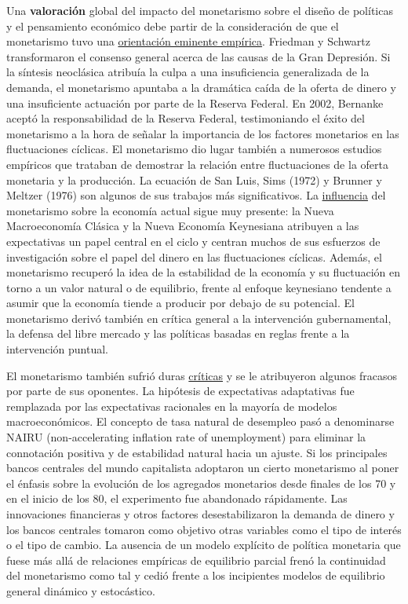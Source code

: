 \documentclass{nuevotema}
\begin{document}
Una \textbf{valoración} global del impacto del monetarismo sobre el diseño de políticas y el pensamiento económico debe partir de la consideración de que el monetarismo tuvo una \underline{orientación eminente empírica}. Friedman y Schwartz transformaron el consenso general acerca de las causas de la Gran Depresión. Si la síntesis neoclásica atribuía la culpa a una insuficiencia generalizada de la demanda, el monetarismo apuntaba a la dramática caída de la oferta de dinero y una insuficiente actuación por parte de la Reserva Federal. En 2002, Bernanke aceptó la responsabilidad de la Reserva Federal, testimoniando el éxito del monetarismo a la hora de señalar la importancia de los factores monetarios en las fluctuaciones cíclicas. El monetarismo dio lugar también a numerosos estudios empíricos que trataban de demostrar la relación entre fluctuaciones de la oferta monetaria y la producción. La ecuación de San Luis, Sims (1972) y Brunner y Meltzer (1976) son algunos de sus trabajos más significativos. La \underline{influencia} del monetarismo sobre la economía actual sigue muy presente: la Nueva Macroeconomía Clásica y la Nueva Economía Keynesiana atribuyen a las expectativas un papel central en el ciclo y centran muchos de sus esfuerzos de investigación sobre el papel del dinero en las fluctuaciones cíclicas. Además, el monetarismo recuperó la idea de la estabilidad de la economía y su fluctuación en torno a un valor natural o de equilibrio, frente al enfoque keynesiano tendente a asumir que la economía tiende a producir por debajo de su potencial. El monetarismo derivó también en crítica general a la intervención gubernamental, la defensa del libre mercado y las políticas basadas en reglas frente a la intervención puntual.

El monetarismo también sufrió duras \underline{críticas} y se le atribuyeron algunos fracasos por parte de sus oponentes. La hipótesis de expectativas adaptativas fue remplazada por las expectativas racionales en la mayoría de modelos macroeconómicos. El concepto de tasa natural de desempleo pasó a denominarse NAIRU (non-accelerating inflation rate of unemployment) para eliminar la connotación positiva y de estabilidad natural hacia un ajuste. Si los principales bancos centrales del mundo capitalista adoptaron un cierto monetarismo al poner el énfasis sobre la evolución de los agregados monetarios desde finales de los 70 y en el inicio de los 80, el experimento fue abandonado rápidamente. Las innovaciones financieras y otros factores desestabilizaron la demanda de dinero y los bancos centrales tomaron como objetivo otras variables como el tipo de interés o el tipo de cambio. La ausencia de un modelo explícito de política monetaria que fuese más allá de relaciones empíricas de equilibrio parcial frenó la continuidad del monetarismo como tal y cedió frente a los incipientes modelos de equilibrio general dinámico y estocástico. 
\end{document}
